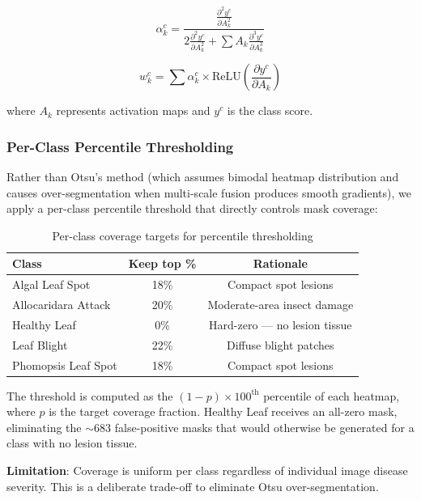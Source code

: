 \documentclass[10pt,a4paper]{article}
\begin{document}
\begin{equation}
\alpha_k^c = \frac{\frac{\partial^2 y^c}{\partial A_k^2}}{2\frac{\partial^2 y^c}{\partial A_k^2} + \sum A_k \frac{\partial^3 y^c}{\partial A_k^3}}
\end{equation}

\begin{equation}
w_k^c = \sum \alpha_k^c \times \text{ReLU}\left(\frac{\partial y^c}{\partial A_k}\right)
\end{equation}

where $A_k$ represents activation maps and $y^c$ is the class score.

\subsubsection{Per-Class Percentile Thresholding}

Rather than Otsu's method (which assumes bimodal heatmap distribution and causes over-segmentation when multi-scale fusion produces smooth gradients), we apply a per-class percentile threshold that directly controls mask coverage:

\begin{table}[H]
\centering
\caption{Per-class coverage targets for percentile thresholding}
\label{tab:percentile}
\begin{tabular}{lcc}
\toprule
\textbf{Class} & \textbf{Keep top \%} & \textbf{Rationale} \\
\midrule
Algal Leaf Spot     & 18\% & Compact spot lesions \\
Allocaridara Attack & 20\% & Moderate-area insect damage \\
Healthy Leaf        & 0\%  & Hard-zero --- no lesion tissue \\
Leaf Blight         & 22\% & Diffuse blight patches \\
Phomopsis Leaf Spot & 18\% & Compact spot lesions \\
\bottomrule
\end{tabular}
\end{table}

The threshold is computed as the $(1 - p) \times 100^{\text{th}}$ percentile of each heatmap, where $p$ is the target coverage fraction. Healthy Leaf receives an all-zero mask, eliminating the $\sim$683 false-positive masks that would otherwise be generated for a class with no lesion tissue.

\textbf{Limitation}: Coverage is uniform per class regardless of individual image disease severity. This is a deliberate trade-off to eliminate Otsu over-segmentation.
\end{document}
